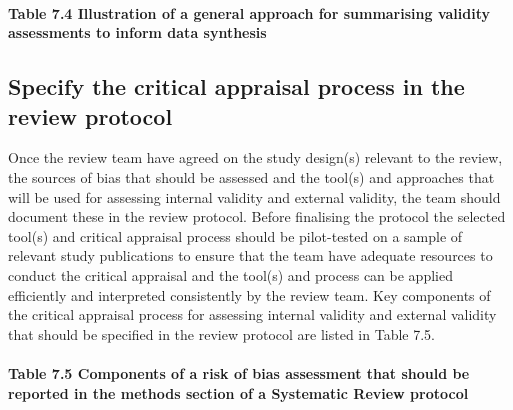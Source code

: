\documentclass[
  letterpaper,
  DIV=11,
  numbers=noendperiod]{scrreprt}
\makeatletter
\let\oldparagraph\paragraph
\renewcommand{\paragraph}{
    \@ifstar
      \xxxParagraphStar
      \xxxParagraphNoStar
  }
\newcommand{\xxxParagraphStar}[1]{\oldparagraph*{#1}\mbox{}}
\newcommand{\xxxParagraphNoStar}[1]{\oldparagraph{#1}\mbox{}}
\makeatother
\begin{document}
\paragraph{\texorpdfstring{\textbf{Table 7.4 Illustration of a general
approach for summarising validity assessments to inform data
synthesis}}{Table 7.4 Illustration of a general approach for summarising validity assessments to inform data synthesis}}\label{table-7.4-illustration-of-a-general-approach-for-summarising-validity-assessments-to-inform-data-synthesis}

\subsection{Specify the critical appraisal process in the review
protocol}\label{specify-the-critical-appraisal-process-in-the-review-protocol}

Once the review team have agreed on the study design(s) relevant to the
review, the sources of bias that should be assessed and the tool(s) and
approaches that will be used for assessing internal validity and
external validity, the team should document these in the review
protocol. Before finalising the protocol the selected tool(s) and
critical appraisal process should be pilot-tested on a sample of
relevant study publications to ensure that the team have adequate
resources to conduct the critical appraisal and the tool(s) and process
can be applied efficiently and interpreted consistently by the review
team. Key components of the critical appraisal process for assessing
internal validity and external validity that should be specified in the
review protocol are listed in Table 7.5.

\paragraph{\texorpdfstring{\textbf{Table 7.5 Components of a risk of
bias assessment that should be reported in the methods section of a
Systematic Review
protocol}}{Table 7.5 Components of a risk of bias assessment that should be reported in the methods section of a Systematic Review protocol}}\label{table-7.5-components-of-a-risk-of-bias-assessment-that-should-be-reported-in-the-methods-section-of-a-systematic-review-protocol}
\end{document}
